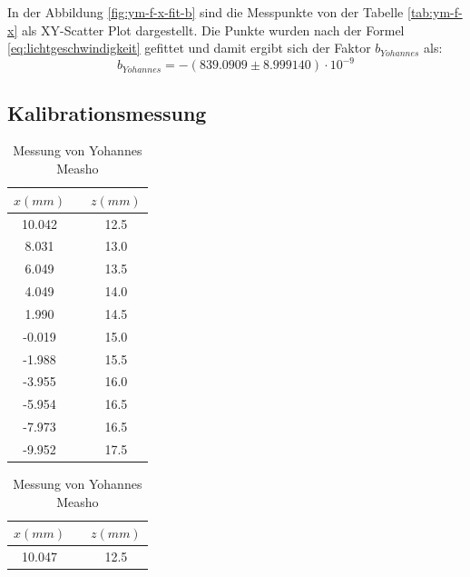 In der Abbildung \ref{fig:ym-f-x-fit-b} sind  die  Messpunkte  von  der  Tabelle
\ref{tab:ym-f-x}  als  XY-Scatter  Plot  dargestellt. Die Punkte wurden nach der
Formel \ref{eq:lichtgeschwindigkeit} gefittet und damit ergibt sich  der  Faktor
$b_{Yohannes}$ als:
\begin{equation}
    b_{Yohannes} = -(839.0909 \pm 8.999140)\cdot 10^{-9}
    \label{eq:ym-b}
\end{equation}


\subsection{Kalibrationsmessung}

\begin{table}[H]
    \caption{Kalibrationsmessdaten}
    \begin{subtable}{.5\linewidth}
        \centering
        \caption{Messung von Alex Murray}
        \label{tab:am-x-z}
        \begin{tabular}{ccc}
            \toprule
            $x (mm)$ & \hspace{5mm} & $z (mm)$ \\
            \midrule
            10.042 && 12.5 \\
            8.031  && 13.0 \\
            6.049  && 13.5 \\
            4.049  && 14.0 \\
            1.990  && 14.5 \\
            -0.019 && 15.0 \\
            -1.988 && 15.5 \\
            -3.955 && 16.0 \\
            -5.954 && 16.5 \\
            -7.973 && 16.5 \\
            -9.952 && 17.5 \\
            \bottomrule
        \end{tabular}
    \end{subtable}%
    \begin{subtable}{.5\linewidth}
        \centering
        \caption{Messung von Yohannes Measho}
        \label{tab:ym-x-z}
        \begin{tabular}{ccc}
            \toprule
            $x (mm)$ & \hspace{5mm} & $z (mm)$ \\
            \midrule
            10.047 && 12.5 \\

\end{tabular}
\end{subtable}
\end{table}
